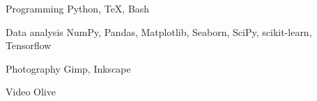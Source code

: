 
\begin{cvskills}

	\cvskill
	{Programming}
    {Python, \TeX, Bash}

	\cvskill
	{Data analysis}
    {NumPy, Pandas, Matplotlib, Seaborn, SciPy, scikit-learn, Tensorflow}

	\cvskill
    {Photography}
    {Gimp, Inkscape}

    \cvskill
    {Video}
    {Olive}

\end{cvskills}
